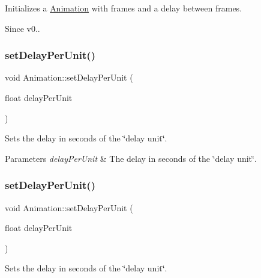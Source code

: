 Initializes a \hyperlink{classAnimation}{Animation} with frames and a delay between frames. \begin{DoxySince}{Since}
v0.. 
\end{DoxySince}
\mbox{\label{classAnimation_aac13966b350fe6f9d93dddfc3d65f9b7}} 
\subsubsection{\texorpdfstring{set\+Delay\+Per\+Unit()}{setDelayPerUnit()}\hspace{0.1cm}{\footnotesize\ttfamily [1/2]}}
{\footnotesize\ttfamily void Animation\+::set\+Delay\+Per\+Unit (\begin{DoxyParamCaption}\item[{float}]{delay\+Per\+Unit }\end{DoxyParamCaption})\hspace{0.3cm}{\ttfamily [inline]}}

Sets the delay in seconds of the \char`\"{}delay unit\char`\"{}.


\begin{DoxyParams}{Parameters}
{\em delay\+Per\+Unit} & The delay in seconds of the \char`\"{}delay unit\char`\"{}. \\
\hline
\end{DoxyParams}
\mbox{\label{classAnimation_aac13966b350fe6f9d93dddfc3d65f9b7}} 
\subsubsection{\texorpdfstring{set\+Delay\+Per\+Unit()}{setDelayPerUnit()}\hspace{0.1cm}{\footnotesize\ttfamily [2/2]}}
{\footnotesize\ttfamily void Animation\+::set\+Delay\+Per\+Unit (\begin{DoxyParamCaption}\item[{float}]{delay\+Per\+Unit }\end{DoxyParamCaption})\hspace{0.3cm}{\ttfamily [inline]}}

Sets the delay in seconds of the \char`\"{}delay unit\char`\"{}.


